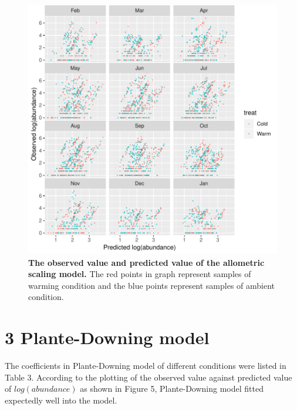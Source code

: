 \documentclass[11pt]{article}
\begin{document}
\begin{linenumbers}
\begin{figure}[H]
  \centering
  \includegraphics[scale = 1.2]{../Graph/as12op.pdf}
  \caption{\textbf{The observed value and predicted value of
  the allometric scaling model.}
  The red points in graph represent samples of warming condition and the blue points represent samples of ambient condition. }
\end{figure}

\section*{3 Plante-Downing model}
The coefficients in Plante-Downing model of different conditions were listed in Table 3. According to the plotting of the observed value against predicted value of $log(abundance)$ as shown in Figure 5, Plante-Downing model fitted expectedly well into the model.




\end{linenumbers}
\end{document}
